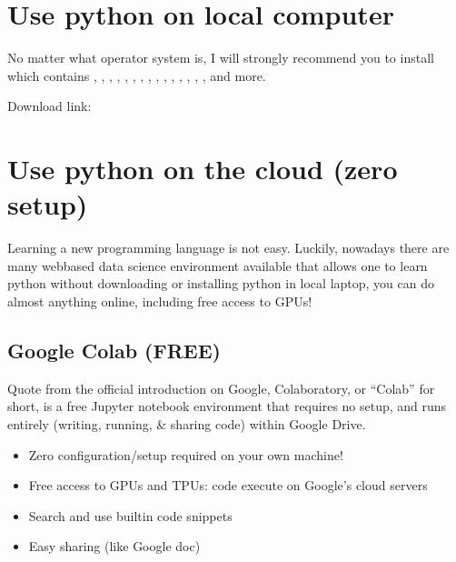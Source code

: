 \documentclass[letterpaper,12pt,english]{sphinxmanual}
\begin{document}
\section{Use python on local computer}
\label{\detokenize{install:use-python-on-local-computer}}
\sphinxAtStartPar
No matter what operator system is, I will strongly recommend you to install
 which contains , , , ,
, , , , , ,
, , , , ,
 and more.

\sphinxAtStartPar
Download link: 

\begin{figure}[htbp]
\centering

\noindent{}
\end{figure}


\section{Use python on the cloud (zero setup)}
\label{\detokenize{install:use-python-on-the-cloud-zero-setup}}
\sphinxAtStartPar
Learning a new programming language is not easy.
Luckily, nowadays there are many web\sphinxhyphen{}based data science environment available
that allows one to learn python without downloading or installing python in
local laptop, you can do almost anything online, including free access to GPUs!


\subsection{Google Colab (FREE)}
\label{\detokenize{install:google-colab-free}}
\sphinxAtStartPar
Quote from the official introduction on Google,
Colaboratory, or “Colab” for short, is a free Jupyter notebook environment
that requires no setup, and runs entirely (writing, running, \& sharing code)
within Google Drive.
\begin{itemize}
\item {} 
\sphinxAtStartPar
Zero configuration/setup required on your own machine!

\item {} 
\sphinxAtStartPar
Free access to GPUs and TPUs: code execute on Google’s cloud servers

\item {} 
\sphinxAtStartPar
Search and use built\sphinxhyphen{}in code snippets

\item {} 
\sphinxAtStartPar
Easy sharing (like Google doc)

\end{itemize}
\end{document}
